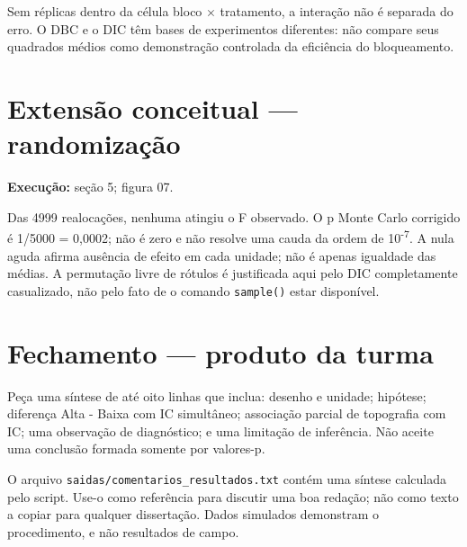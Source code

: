 Sem réplicas dentro da célula bloco \ensuremath{\times} tratamento, a interação não é separada do erro. O DBC e o DIC têm bases de experimentos diferentes: não compare seus quadrados médios como demonstração controlada da eficiência do bloqueamento.

\section{Extensão conceitual --- randomização}

\textbf{Execução:} seção 5; figura 07.

Das 4999 realocações, nenhuma atingiu o F observado. O p Monte Carlo corrigido é 1/5000 = 0,0002; não é zero e não resolve uma cauda da ordem de 10\textsuperscript{-}\textsuperscript{7}. A nula aguda afirma ausência de efeito em cada unidade; não é apenas igualdade das médias. A permutação livre de rótulos é justificada aqui pelo DIC completamente casualizado, não pelo fato de o comando \texttt{sample()} estar disponível.

\section{Fechamento --- produto da turma}

Peça uma síntese de até oito linhas que inclua: desenho e unidade; hipótese; diferença Alta - Baixa com IC simultâneo; associação parcial de topografia com IC; uma observação de diagnóstico; e uma limitação de inferência. Não aceite uma conclusão formada somente por valores-p.

O arquivo \texttt{saidas/comentarios\_resultados.txt} contém uma síntese calculada pelo script. Use-o como referência para discutir uma boa redação; não como texto a copiar para qualquer dissertação. Dados simulados demonstram o procedimento, e não resultados de campo.
